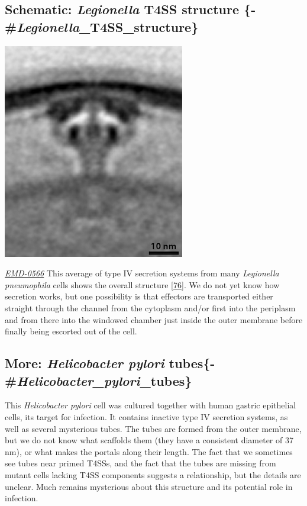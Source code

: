 \documentclass[]{tufte-book}
\begin{document}
\hypertarget{schematic-legionella-t4ss-structure--legionella_t4ss_structure}{%
\subsection{\texorpdfstring{Schematic: \emph{Legionella} T4SS structure \{-\#\emph{Legionella}\_T4SS\_structure\}}{Schematic: Legionella T4SS structure \{-\#Legionella\_T4SS\_structure\}}}\label{schematic-legionella-t4ss-structure--legionella_t4ss_structure}}

\includegraphics{img/schematics/9_3_2}

\href{https://www.ebi.ac.uk/pdbe/entry/emdb/EMD-0566}{\emph{EMD-0566}}
This average of type IV secretion systems from many \emph{Legionella pneumophila} cells shows the overall structure {[}\protect\hyperlink{ref-ghosal2019a}{76}{]}. We do not yet know how secretion works, but one possibility is that effectors are transported either straight through the channel from the cytoplasm and/or first into the periplasm and from there into the windowed chamber just inside the outer membrane before finally being escorted out of the cell.

\hypertarget{more-helicobacter-pylori-tubes-helicobacter_pylori_tubes}{%
\subsection{\texorpdfstring{More: \emph{Helicobacter pylori} tubes\{-\#\emph{Helicobacter\_pylori}\_tubes\}}{More: Helicobacter pylori tubes\{-\#Helicobacter\_pylori\_tubes\}}}\label{more-helicobacter-pylori-tubes-helicobacter_pylori_tubes}}

This \emph{Helicobacter pylori} cell was cultured together with human gastric epithelial cells, its target for infection. It contains inactive type IV secretion systems, as well as several mysterious tubes. The tubes are formed from the outer membrane, but we do not know what scaffolds them (they have a consistent diameter of 37 nm), or what makes the portals along their length. The fact that we sometimes see tubes near primed T4SSs, and the fact that the tubes are missing from mutant cells lacking T4SS components suggests a relationship, but the details are unclear. Much remains mysterious about this structure and its potential role in infection.
\end{document}
